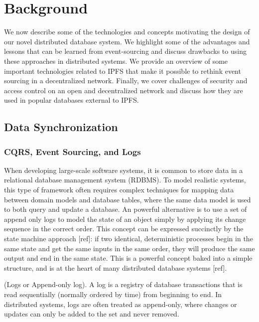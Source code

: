 \documentclass{comjnl}
\begin{document}
\section{Background}
\label{sec:Background}

We now describe some of the technologies and concepts motivating the design of our novel distributed database system. We highlight some of the advantages and lessons that can be learned from event-sourcing and discuss drawbacks to using these approaches in distributed systems. We provide an overview of some important technologies related to IPFS that make it possible to rethink event sourcing in a decentralized network. Finally, we cover challenges of security and access control on an open and decentralized network and discuss how they are used in popular databases external to IPFS. 

\subsection{Data Synchronization}

\subsubsection{CQRS, Event Sourcing, and Logs}

When developing large-scale software systems, it is common to store data in a relational database management system (RDBMS). To model realistic systems, this type of framework often requires complex techniques for mapping data between domain models and database tables, where the same data model is used to both query and update a database. An powerful alternative is to use a set of append only logs to model the state of an object simply by applying its change sequence in the correct order. This concept can be expressed succinctly by the state machine approach [ref]: if two identical, deterministic processes begin in the same state and get the same inputs in the same order, they will produce the same output and end in the same state. This is a powerful concept baked into a simple structure, and is at the heart of many distributed database systems [ref].

\begin{definition} (Logs or Append-only log). A log is a registry of database transactions that is read sequentially (normally ordered by time) from beginning to end. In distributed systems, logs are often treated as append-only, where changes or updates can only be added to the set and never removed.  \end{definition} \label{def:Logs}
\end{document}
